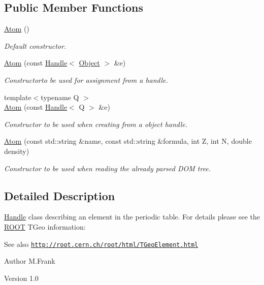 \subsection*{Public Member Functions}
\begin{DoxyCompactItemize}
\item 
\hyperlink{class_d_d4hep_1_1_geometry_1_1_atom_ac4b6668ca1e8fc3b021642f398f74d03}{Atom} ()
\begin{DoxyCompactList}\small\item\em Default constructor. \item\end{DoxyCompactList}\item 
\hyperlink{class_d_d4hep_1_1_geometry_1_1_atom_a60bf5f87d457ce7d265149f6a13c4c0f}{Atom} (const \hyperlink{class_d_d4hep_1_1_handle}{Handle}$<$ \hyperlink{class_d_d4hep_1_1_geometry_1_1_atom_a9fdd9fe52048018b3cba23bc9fb855fd}{Object} $>$ \&e)
\begin{DoxyCompactList}\small\item\em Constructorto be used for assignment from a handle. \item\end{DoxyCompactList}\item 
{\footnotesize template$<$typename Q $>$ }\\\hyperlink{class_d_d4hep_1_1_geometry_1_1_atom_a4f9316b8434e5bbe78289d14d9269b66}{Atom} (const \hyperlink{class_d_d4hep_1_1_handle}{Handle}$<$ Q $>$ \&e)
\begin{DoxyCompactList}\small\item\em Constructor to be used when creating from a object handle. \item\end{DoxyCompactList}\item 
\hyperlink{class_d_d4hep_1_1_geometry_1_1_atom_ae9733eb464b82605b59a9d67eae7f161}{Atom} (const std::string \&name, const std::string \&formula, int Z, int N, double density)
\begin{DoxyCompactList}\small\item\em Constructor to be used when reading the already parsed DOM tree. \item\end{DoxyCompactList}\end{DoxyCompactItemize}


\subsection{Detailed Description}
\hyperlink{class_d_d4hep_1_1_handle}{Handle} class describing an element in the periodic table. For details please see the \hyperlink{namespace_r_o_o_t}{ROOT} TGeo information: \begin{DoxySeeAlso}{See also}
\href{http://root.cern.ch/root/html/TGeoElement.html}{\tt http://root.cern.ch/root/html/TGeoElement.html}
\end{DoxySeeAlso}
\begin{DoxyAuthor}{Author}
M.Frank 
\end{DoxyAuthor}
\begin{DoxyVersion}{Version}
1.0 
\end{DoxyVersion}


